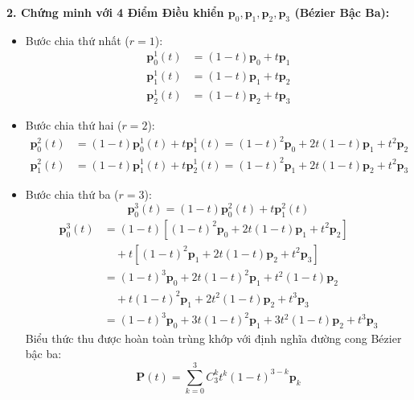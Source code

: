 \textbf{2. Chứng minh với 4 Điểm Điều khiển $\mathbf{p}_0, \mathbf{p}_1, \mathbf{p}_2, \mathbf{p}_3$ (Bézier Bậc Ba):}
\begin{itemize}
    \item Bước chia thứ nhất ($r = 1$):
    \begin{align}
    \mathbf{p}_0^1(t) &= (1 - t) \mathbf{p}_0 + t \mathbf{p}_1 \\
    \mathbf{p}_1^1(t) &= (1 - t) \mathbf{p}_1 + t \mathbf{p}_2 \\
    \mathbf{p}_2^1(t) &= (1 - t) \mathbf{p}_2 + t \mathbf{p}_3
    \end{align}
    \item Bước chia thứ hai ($r = 2$):
    \begin{align}
    \mathbf{p}_0^2(t) &= (1 - t) \mathbf{p}_0^1(t) + t \mathbf{p}_1^1(t) = (1 - t)^2 \mathbf{p}_0 + 2t(1 - t) \mathbf{p}_1 + t^2 \mathbf{p}_2 \\
    \mathbf{p}_1^2(t) &= (1 - t) \mathbf{p}_1^1(t) + t \mathbf{p}_2^1(t) = (1 - t)^2 \mathbf{p}_1 + 2t(1 - t) \mathbf{p}_2 + t^2 \mathbf{p}_3
    \end{align}
    \item Bước chia thứ ba ($r = 3$):
    \begin{equation}
    \mathbf{p}_0^3(t) = (1 - t) \mathbf{p}_0^2(t) + t \mathbf{p}_1^2(t)
    \end{equation}
    \begin{align}
    \mathbf{p}_0^3(t) &= (1 - t)\left[(1 - t)^2 \mathbf{p}_0 + 2t(1 - t) \mathbf{p}_1 + t^2 \mathbf{p}_2\right] \nonumber \\
    &\quad + t\left[(1 - t)^2 \mathbf{p}_1 + 2t(1 - t) \mathbf{p}_2 + t^2 \mathbf{p}_3\right] \nonumber \\
    &= (1 - t)^3 \mathbf{p}_0 + 2t(1 - t)^2 \mathbf{p}_1 + t^2(1 - t) \mathbf{p}_2 \nonumber \\
    &\quad + t(1 - t)^2 \mathbf{p}_1 + 2t^2(1 - t) \mathbf{p}_2 + t^3 \mathbf{p}_3 \nonumber \\
    &= (1 - t)^3 \mathbf{p}_0 + 3t(1 - t)^2 \mathbf{p}_1 + 3t^2(1 - t) \mathbf{p}_2 + t^3 \mathbf{p}_3
    \end{align}
    Biểu thức thu được hoàn toàn trùng khớp với định nghĩa đường cong Bézier bậc ba:
    \begin{equation}
    \mathbf{P}(t) = \sum_{k=0}^3 C_3^k t^k (1 - t)^{3-k} \mathbf{p}_k
    \end{equation}
\end{itemize}

